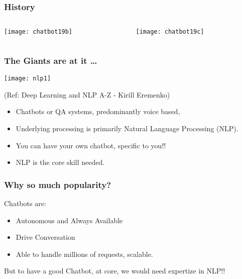 \begin{frame}[fragile]\frametitle{History}

    \begin{columns}
    \begin{column}[t]{0.5\linewidth}
\begin{center}
\texttt{[image: chatbot19b]}

\end{center}
    \end{column}
    \begin{column}[t]{0.5\linewidth}
\begin{center}
\texttt{[image: chatbot19c]}

\end{center}
    \end{column}
  \end{columns}
  
  

	
\end{frame}


\begin{frame}[fragile]\frametitle{The Giants are at it \ldots}
\begin{center}
\texttt{[image: nlp1]}

\tiny{(Ref: Deep Learning and NLP A-Z - Kirill Eremenko)}
\end{center}

	\begin{itemize}
	\item Chatbots or QA systems, predominantly voice based, 
	\item Underlying processing is primarily Natural Language Processing (NLP).
	\item You can have your own chatbot, specific to you!! 
	\item NLP is the core skill needed.
	\end{itemize}
	
\end{frame}


\begin{frame}[fragile]\frametitle{Why so much popularity?}
Chatbots are:
	\begin{itemize}
	\item Autonomous and Always Available
	\item Drive Conversation
	\item Able to handle millions of requests, scalable.
	\end{itemize}
	
But to have a good Chatbot, at core, we would need expertize in NLP!!

\end{frame}





